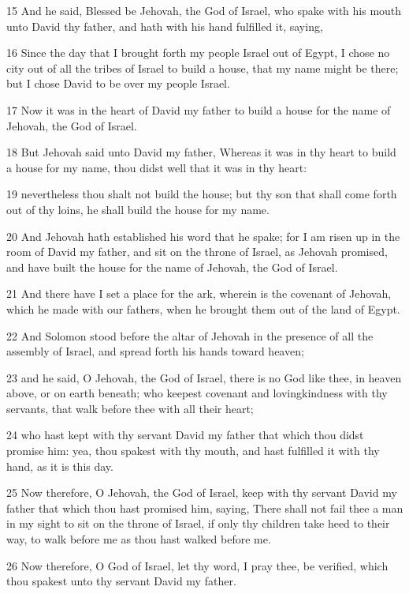 \par 15 And he said, Blessed be Jehovah, the God of Israel, who spake with his mouth unto David thy father, and hath with his hand fulfilled it, saying,
\par 16 Since the day that I brought forth my people Israel out of Egypt, I chose no city out of all the tribes of Israel to build a house, that my name might be there; but I chose David to be over my people Israel.
\par 17 Now it was in the heart of David my father to build a house for the name of Jehovah, the God of Israel.
\par 18 But Jehovah said unto David my father, Whereas it was in thy heart to build a house for my name, thou didst well that it was in thy heart:
\par 19 nevertheless thou shalt not build the house; but thy son that shall come forth out of thy loins, he shall build the house for my name.
\par 20 And Jehovah hath established his word that he spake; for I am risen up in the room of David my father, and sit on the throne of Israel, as Jehovah promised, and have built the house for the name of Jehovah, the God of Israel.
\par 21 And there have I set a place for the ark, wherein is the covenant of Jehovah, which he made with our fathers, when he brought them out of the land of Egypt.
\par 22 And Solomon stood before the altar of Jehovah in the presence of all the assembly of Israel, and spread forth his hands toward heaven;
\par 23 and he said, O Jehovah, the God of Israel, there is no God like thee, in heaven above, or on earth beneath; who keepest covenant and lovingkindness with thy servants, that walk before thee with all their heart;
\par 24 who hast kept with thy servant David my father that which thou didst promise him: yea, thou spakest with thy mouth, and hast fulfilled it with thy hand, as it is this day.
\par 25 Now therefore, O Jehovah, the God of Israel, keep with thy servant David my father that which thou hast promised him, saying, There shall not fail thee a man in my sight to sit on the throne of Israel, if only thy children take heed to their way, to walk before me as thou hast walked before me.
\par 26 Now therefore, O God of Israel, let thy word, I pray thee, be verified, which thou spakest unto thy servant David my father.
